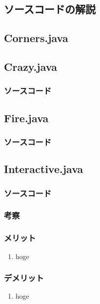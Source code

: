 \documentclass[12pt]{jarticle} %
\begin{document}
\begin{flushleft}

\section{ソースコードの解説}
\subsection{Corners.java}


\newpage

\subsection{Crazy.java}
\subsubsection{ソースコード}


\newpage

\subsection{Fire.java}
\subsubsection{ソースコード}


\newpage

\subsection{Interactive.java}
\subsubsection{ソースコード}

\subsubsection{考察}
\subsubsection{メリット}
\begin{enumerate}
\item hoge
\end{enumerate}
\subsubsection{デメリット}
\begin{enumerate}
\item hoge
\end{enumerate}


\end{flushleft}
\end{document}
